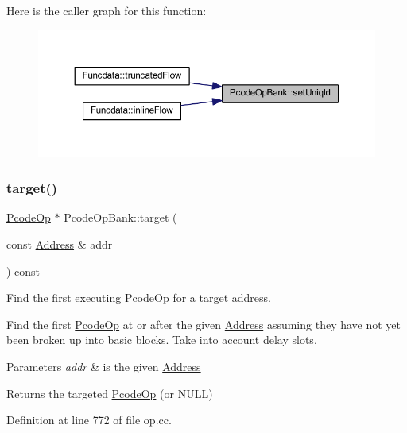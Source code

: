 Here is the caller graph for this function\+:
\nopagebreak
\begin{figure}[H]
\begin{center}
\leavevmode
\includegraphics[width=350pt]{class_pcode_op_bank_a598db9267369f9dbe7d044ac3dbb03e9_icgraph}
\end{center}
\end{figure}
\mbox{\label{class_pcode_op_bank_a12b06dc13326ce0291125b9dd11fadee}} 
\subsubsection{\texorpdfstring{target()}{target()}}
{\footnotesize\ttfamily \mbox{\hyperlink{class_pcode_op}{Pcode\+Op}} $\ast$ Pcode\+Op\+Bank\+::target (\begin{DoxyParamCaption}\item[{const \mbox{\hyperlink{class_address}{Address}} \&}]{addr }\end{DoxyParamCaption}) const}



Find the first executing \mbox{\hyperlink{class_pcode_op}{Pcode\+Op}} for a target address. 

Find the first \mbox{\hyperlink{class_pcode_op}{Pcode\+Op}} at or after the given \mbox{\hyperlink{class_address}{Address}} assuming they have not yet been broken up into basic blocks. Take into account delay slots. 
\begin{DoxyParams}{Parameters}
{\em addr} & is the given \mbox{\hyperlink{class_address}{Address}} \\
\hline
\end{DoxyParams}
\begin{DoxyReturn}{Returns}
the targeted \mbox{\hyperlink{class_pcode_op}{Pcode\+Op}} (or N\+U\+LL) 
\end{DoxyReturn}


Definition at line 772 of file op.\+cc.

